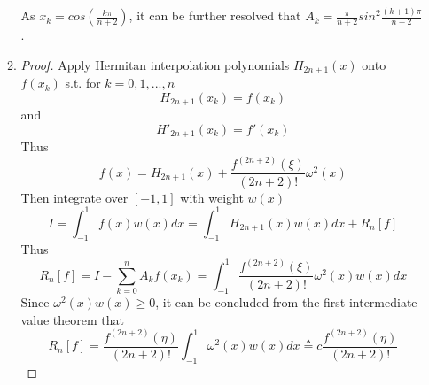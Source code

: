 \documentclass[paper=a4, fontsize=11pt]{scrartcl} %
\numberwithin{equation}{section} %
\numberwithin{figure}{section} %
\numberwithin{table}{section} %
\begin{document}
\begin{enumerate}
\begin{enumerate}
				As $x_k = cos(\frac{k\pi}{n+2})$, it can be further resolved that $A_k = \frac{\pi}{n+2}sin^2\frac{(k+1)\pi}{n+2}$.
			\item 
				\begin{proof}
					Apply Hermitan interpolation polynomials $H_{2n+1}(x)$ onto $f(x_k)$ s.t. for $k = 0, 1, ... , n$
					\begin{equation}
						H_{2n+1}(x_k) = f(x_k) 
					\end{equation}
					and
					\begin{equation}
						H'_{2n+1}(x_k) = f'(x_k)
					\end{equation}
					Thus
					\begin{equation}
						f(x) = H_{2n+1}(x) + \frac{f^{(2n+2)}(\xi)}{(2n+2)!}\omega^2(x)
					\end{equation}
					Then integrate over $[-1, 1]$ with weight $w(x)$
					\begin{equation}
						I = \int_{-1}^{1} f(x) w(x) dx = \int_{-1}^{1} H_{2n+1}(x) w(x)dx + R_n[f]
					\end{equation}
					Thus
					\begin{equation}
						R_n[f] = I- \sum_{k=0}^{n}A_k f(x_k) = \int_{-1}^{1}\frac{f^{(2n+2)}(\xi)}{(2n+2)!}\omega^2(x)w(x)dx
					\end{equation}
					Since $\omega^2(x)w(x) \geq 0$, it can be concluded from the first intermediate value theorem that
					\begin{equation}
						R_n[f] = \frac{f^{(2n+2)}(\eta)}{(2n+2)!}\int_{-1}^{1}\omega^2(x)w(x)dx \triangleq c  \frac{f^{(2n+2)}(\eta)}{(2n+2)!}
					\end{equation}
					
				\end{proof}
			
		\end{enumerate}
\end{enumerate}
\end{document}
